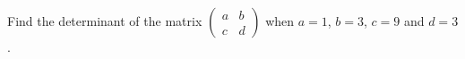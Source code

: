 Find the determinant of the matrix $\begin{pmatrix}a&b\\c&d\end{pmatrix}$ when $a=1$, $b=3$, $c=9$ and $d=3$.
